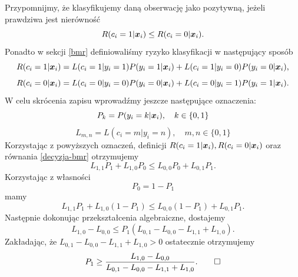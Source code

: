 \documentclass[inzynierska]{pwr_wmat_praca_dyplomowa}
\theoremstyle{plain}
\numberwithin{theorem}{chapter}
\theoremstyle{definition}
\numberwithin{theorem}{chapter}
\begin{document}
Przypomnijmy, że klasyfikujemy daną obserwację jako pozytywną, jeżeli prawdziwa jest  nierówność
\begin{equation}
	\label{decyzja-bmr}
	R(c_i = 1|\boldsymbol{x}_{i}) \leq R(c_i = 0|\boldsymbol{x}_{i}) \text{.}
\end{equation}
Ponadto w sekcji \ref{bmr} definiowaliśmy ryzyko klasyfikacji w następujący sposób
$$ R(c_i = 1|\boldsymbol{x}_{i}) = L(c_i = 1|y_i = 1)P(y_i = 1|\boldsymbol{x}_{i}) + L(c_i = 1|y_i = 0)P(y_i = 0|\boldsymbol{x}_{i}) \text{,}$$
$$ R(c_i = 0|\boldsymbol{x}_{i}) = L(c_i = 0|y_i = 0)P(y_i = 0|\boldsymbol{x}_{i}) + L(c_i = 0|y_i = 1)P(y_i = 1|\boldsymbol{x}_{i}) \text{.}$$
W celu skrócenia zapisu wprowadźmy jeszcze następujące oznaczenia:
$$ P_k = P(y_i = k|\boldsymbol{x}_{i}), \quad k \in \{0,1\} $$
$$ L_{m,n} = L(c_i = m|y_i = n), \quad m,n \in \{0,1\}$$
Korzystając z powyższych oznaczeń, definicji $R(c_i = 1|\boldsymbol{x}_{i}), R(c_i = 0|\boldsymbol{x}_{i})$ oraz równania \ref{decyzja-bmr} otrzymujemy
$$ L_{1,1}P_1 + L_{1,0}P_0 \leq L_{0,0}P_0 + L_{0,1}P_1 \text{.}$$
Korzystając z własności 
$$ P_0 = 1 - P_1 $$
mamy
$$ L_{1,1}P_1 + L_{1,0}(1-P_1) \leq L_{0,0}(1-P_1) + L_{0,1}P_1 \text{.}$$
Następnie dokonując przekształcenia algebraiczne, dostajemy
$$ L_{1,0}-L_{0,0} \leq P_1 (L_{0,1} - L_{0,0} - L_{1,1} + L_{1,0}) \text{.} $$
Zakładając, że $L_{0,1} - L_{0,0} - L_{1,1} + L_{1,0} > 0$ ostatecznie otrzymujemy
$$ P_1 \geq \frac{L_{1,0}-L_{0,0}}{L_{0,1} - L_{0,0} - L_{1,1} + L_{1,0}}. \qed $$
\backmatter
\nocite{*}

\end{document}
